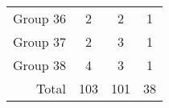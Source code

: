 \begin{table}[H]
\begin{tabular}{@{}rccc@{}}
        Group 36 & 2                                         & 2                                          & 1                                      \\
        Group 37 & 2                                         & 3                                          & 1                                      \\
        Group 38 & 4                                         & 3                                          & 1                                      \\ \midrule
        Total    & 103                                       & 101                                        & 38                                     \\
        \bottomrule
    \end{tabular}
\end{table}

